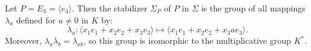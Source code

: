 Let $P = E_3 = \langle e_3 \rangle$. Then the stabilizer $\Sigma_P$ of $P$ in $\Sigma$ is the group of all mappings $\lambda_a$ defined for $a \neq 0$ in $K$ by:
$$\lambda_a: \langle x_1 e_1 + x_2 e_2 + x_3 e_3 \rangle \mapsto \langle x_1 e_1 + x_2 e_2 + x_3 a e_3 \rangle.$$
Moreover, $\lambda_a \lambda_b = \lambda_{ab}$, so this group is isomorphic to the multiplicative group $K^*$.

